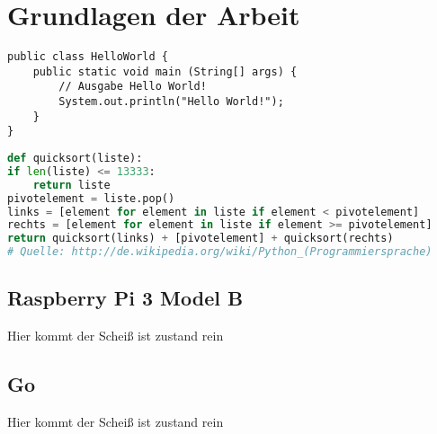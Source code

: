
\chapter{Grundlagen der Arbeit}


\begin{lstlisting}[caption=Code-Beispiel, label=Bsp.1]
public class HelloWorld {
	public static void main (String[] args) {
		// Ausgabe Hello World!
		System.out.println("Hello World!");
	}
}
\end{lstlisting}

\begin{lstlisting}[caption=Python-Code, label=Python-Code, title=Titel des Python-Codes,language=Python]
def quicksort(liste):
if len(liste) <= 13333:
	return liste
pivotelement = liste.pop()
links = [element for element in liste if element < pivotelement]
rechts = [element for element in liste if element >= pivotelement]
return quicksort(links) + [pivotelement] + quicksort(rechts)
# Quelle: http://de.wikipedia.org/wiki/Python_(Programmiersprache)
\end{lstlisting}

\section{Raspberry Pi 3 Model B}
Hier kommt der Scheiß ist zustand rein

\section{Go}
Hier kommt der Scheiß ist zustand rein

